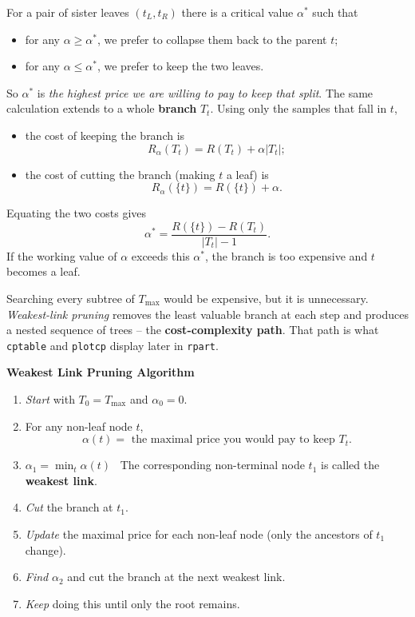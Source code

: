 \documentclass[
]{book}
\begin{document}
For a pair of sister leaves \((t_L, t_R)\) there is a critical value \(\alpha^{*}\) such that

\begin{itemize}
\item
  for any \(\alpha \ge \alpha^{*}\), we prefer to collapse them back to the parent \(t\);
\item
  for any \(\alpha \le \alpha^{*}\), we prefer to keep the two leaves.
\end{itemize}

So \(\alpha^{*}\) is \emph{the highest price we are willing to pay to keep that split}. The same calculation extends to a whole \textbf{branch} \(T_t\). Using only the samples that fall in \(t\),

\begin{itemize}
\item
  the cost of keeping the branch is
  \[R_{\alpha}(T_t) = R(T_t) + \alpha |T_t|;\]
\item
  the cost of cutting the branch (making \(t\) a leaf) is
  \[R_{\alpha}(\{t\}) = R(\{t\}) + \alpha.\]
\end{itemize}

Equating the two costs gives
\[\alpha^{*} = \frac{R(\{t\})  - R(T_t)}{|T_t|-1}.\]
If the working value of \(\alpha\) exceeds this \(\alpha^{*}\), the branch is too expensive and \(t\) becomes a leaf.

Searching every subtree of \(T_{\max}\) would be expensive, but it is unnecessary. \emph{Weakest-link pruning} removes the least valuable branch at each step and produces a nested sequence of trees -- the \textbf{cost-complexity path}. That path is what \texttt{cptable} and \texttt{plotcp} display later in \texttt{rpart}.

\textbf{Weakest Link Pruning Algorithm}

\begin{enumerate}
\def\labelenumi{\arabic{enumi}.}
\item
  \emph{Start} with \(T_0=T_{\max}\) and \(\alpha_0=0\).
\item
  For any non-leaf node \(t\),
  \[\alpha(t) = \text{   the maximal price you would pay to keep } T_t. \]
\item
  \(\alpha_1 = \min_t \alpha(t)\)~
  The corresponding non-terminal node \(t_1\) is called the \textbf{weakest link}.
\item
  \emph{Cut} the branch at \(t_1\).
\item
  \emph{Update} the maximal price for each non-leaf node (only the ancestors of \(t_1\) change).
\item
  \emph{Find} \(\alpha_2\) and cut the branch at the next weakest link.\medskip
\item
  \emph{Keep} doing this until only the root remains.
\end{enumerate}
\end{document}
